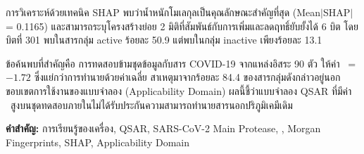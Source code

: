 การวิเคราะห์ด้วยเทคนิค SHAP พบว่าน้ำหนักโมเลกุลเป็นคุณลักษณะสำคัญที่สุด (Mean$|$SHAP$|$ = 0.1165) และสามารถระบุโครงสร้างย่อย 2 มิติที่สัมพันธ์กับการเพิ่มและลดฤทธิ์ยับยั้งได้ 6 บิต โดยบิตที่ 301 พบในสารกลุ่ม active ร้อยละ 50.9 แต่พบในกลุ่ม inactive เพียงร้อยละ 13.1

ข้อค้นพบที่สำคัญคือ การทดสอบข้ามชุดข้อมูลกับสาร COVID-19 จากแหล่งอิสระ 90 ตัว ให้ค่า \Rsq\ = $-1.72$ ซึ่งแย่กว่าการทำนายด้วยค่าเฉลี่ย สาเหตุมาจากร้อยละ 84.4 ของสารกลุ่มดังกล่าวอยู่นอกขอบเขตการใช้งานของแบบจำลอง (Applicability Domain) ผลนี้ชี้ว่าแบบจำลอง QSAR ที่มีค่า \Rsq\ สูงบนชุดทดสอบภายในไม่ได้รับประกันความสามารถทำนายสารนอกปริภูมิเคมีเดิม

\vspace{0.8em}
\noindent\textbf{คำสำคัญ:} การเรียนรู้ของเครื่อง, QSAR, SARS-CoV-2 Main Protease, \pICfifty, Morgan Fingerprints, SHAP, Applicability Domain

